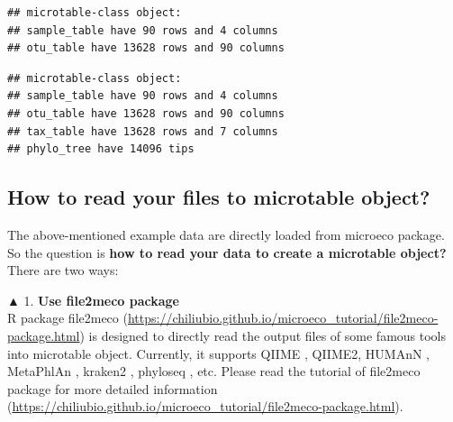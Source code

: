 \documentclass[
]{book}
\newenvironment{Shaded}{\begin{snugshade}}{\end{snugshade}}
\newcommand{\AttributeTok}[1]{\textcolor[rgb]{0.77,0.63,0.00}{#1}}
\newcommand{\CommentTok}[1]{\textcolor[rgb]{0.56,0.35,0.01}{\textit{#1}}}
\newcommand{\FunctionTok}[1]{\textcolor[rgb]{0.00,0.00,0.00}{#1}}
\newcommand{\NormalTok}[1]{#1}
\newcommand{\OtherTok}[1]{\textcolor[rgb]{0.56,0.35,0.01}{#1}}
\newcommand{\SpecialCharTok}[1]{\textcolor[rgb]{0.00,0.00,0.00}{#1}}
\begin{document}
\begin{verbatim}
## microtable-class object:
## sample_table have 90 rows and 4 columns
## otu_table have 13628 rows and 90 columns
\end{verbatim}

\begin{Shaded}
\end{Shaded}

\begin{verbatim}
## microtable-class object:
## sample_table have 90 rows and 4 columns
## otu_table have 13628 rows and 90 columns
## tax_table have 13628 rows and 7 columns
## phylo_tree have 14096 tips
\end{verbatim}

\hypertarget{how-to-read-your-files-to-microtable-object}{%
\subsection{How to read your files to microtable object?}\label{how-to-read-your-files-to-microtable-object}}

The above-mentioned example data are directly loaded from microeco package.
So the question is \textbf{how to read your data to create a microtable object?}\\
There are two ways:

▲ 1. \textbf{Use file2meco package}\\
R package file2meco (\url{https://chiliubio.github.io/microeco_tutorial/file2meco-package.html}) is designed to directly read the output files of some famous tools into microtable object.
Currently, it supports QIIME \citep{Caporaso_QIIME_2010}, QIIME2\citep{Bolyen_Reproducible_2019},
HUMAnN \citep{Franzosa_Species_2018}, MetaPhlAn \citep{Truong_MeTApHLaN2_2015}, kraken2 \citep{Wood_Improved_2019}, phyloseq \citep{Mcmurdie_phyloseq_2013}, etc.
Please read the tutorial of file2meco package for more detailed information (\url{https://chiliubio.github.io/microeco_tutorial/file2meco-package.html}).
\end{document}
